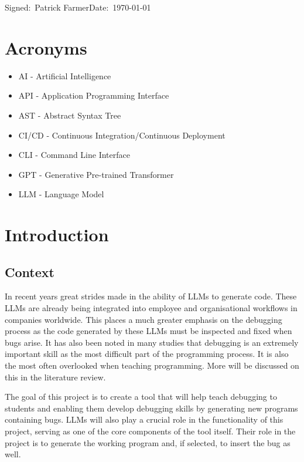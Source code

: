 \documentclass[12pt]{extarticle}
\begin{document}
\small Signed:~Patrick Farmer\hfill Date:~\today

\newpage
\tableofcontents

\newpage
\section*{Acronyms}

\begin{itemize}
    \item AI - Artificial Intelligence
    \item API - Application Programming Interface
    \item AST - Abstract Syntax Tree
    \item CI/CD - Continuous Integration/Continuous Deployment
    \item CLI - Command Line Interface
    \item GPT - Generative Pre-trained Transformer
    \item LLM - Language Model
\end{itemize}
\newpage
\section{Introduction}

\subsection{Context}

In recent years great strides made in the ability of LLMs to generate code. These LLMs are already being integrated into employee and organisational workflows in companies worldwide. This places a much greater emphasis on the debugging process as the code generated by these LLMs must be inspected and fixed when bugs arise. It has also been noted in many studies that debugging is an extremely important skill as the most difficult part of the programming process. It is also the most often overlooked when teaching programming. More will be discussed on this in the literature review. 

The goal of this project is to create a tool that will help teach debugging to students and enabling them develop debugging skills by generating new programs containing bugs. LLMs will also play a crucial role in the functionality of this project, serving as one of the core components of the tool itself. Their role in the project is to generate the working program and, if selected, to insert the bug as well.
\end{document}
